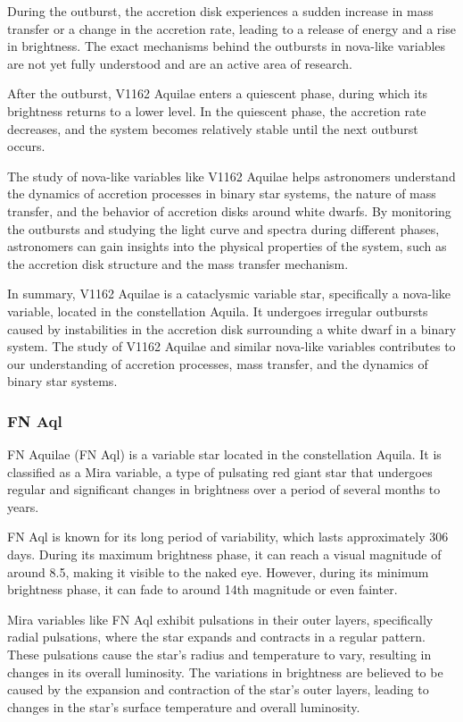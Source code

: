 During the outburst, the accretion disk experiences a sudden increase in mass transfer or a change in the accretion rate, leading to a release of energy and a rise in brightness. The exact mechanisms behind the outbursts in nova-like variables are not yet fully understood and are an active area of research.

After the outburst, V1162 Aquilae enters a quiescent phase, during which its brightness returns to a lower level. In the quiescent phase, the accretion rate decreases, and the system becomes relatively stable until the next outburst occurs.

The study of nova-like variables like V1162 Aquilae helps astronomers understand the dynamics of accretion processes in binary star systems, the nature of mass transfer, and the behavior of accretion disks around white dwarfs. By monitoring the outbursts and studying the light curve and spectra during different phases, astronomers can gain insights into the physical properties of the system, such as the accretion disk structure and the mass transfer mechanism.

In summary, V1162 Aquilae is a cataclysmic variable star, specifically a nova-like variable, located in the constellation Aquila. It undergoes irregular outbursts caused by instabilities in the accretion disk surrounding a white dwarf in a binary system. The study of V1162 Aquilae and similar nova-like variables contributes to our understanding of accretion processes, mass transfer, and the dynamics of binary star systems.

\subsubsection*{ FN Aql }
FN Aquilae (FN Aql) is a variable star located in the constellation Aquila. It is classified as a Mira variable, a type of pulsating red giant star that undergoes regular and significant changes in brightness over a period of several months to years.

FN Aql is known for its long period of variability, which lasts approximately 306 days. During its maximum brightness phase, it can reach a visual magnitude of around 8.5, making it visible to the naked eye. However, during its minimum brightness phase, it can fade to around 14th magnitude or even fainter.

Mira variables like FN Aql exhibit pulsations in their outer layers, specifically radial pulsations, where the star expands and contracts in a regular pattern. These pulsations cause the star's radius and temperature to vary, resulting in changes in its overall luminosity. The variations in brightness are believed to be caused by the expansion and contraction of the star's outer layers, leading to changes in the star's surface temperature and overall luminosity.

